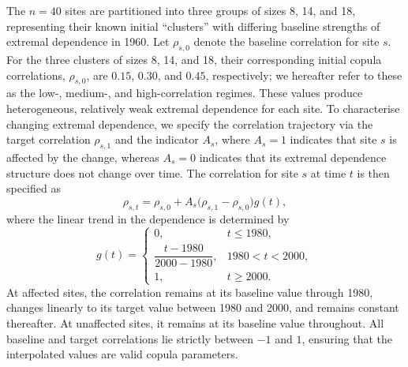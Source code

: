 \documentclass[APA,STIX1COL]{WileyNJD-v2}
\begin{document}
The $n=40$ sites are partitioned into three groups of sizes 8, 14, and 18, representing their known initial ``clusters'' with differing baseline strengths of extremal dependence in 1960.
Let $\rho_{s,0}$ denote the baseline correlation for site $s$. For the three clusters of sizes 8, 14, and 18, their corresponding initial copula correlations, $\rho_{s,0}$, are $0.15$, $0.30$, and $0.45$, respectively; we hereafter refer to these as the low-, medium-, and high-correlation regimes.
These values produce heterogeneous, relatively weak extremal dependence for each site.
To characterise changing extremal dependence, we specify the correlation trajectory via the target correlation $\rho_{s,1}$ and the indicator $A_s$, where $A_s=1$ indicates that site $s$ is affected by the change, whereas $A_s=0$ indicates that its extremal dependence structure does not change over time.
The correlation for site $s$ at time $t$ is then specified as 
\begin{equation}
\label{eq:sim_rho}
\rho_{s,t}=\rho_{s,0}+A_s\bigl(\rho_{s,1}-\rho_{s,0}\bigr)g(t),
\end{equation}
where the linear trend in the dependence is determined by 
\begin{equation}
\label{eq:sim_transition}
g(t)=
\begin{cases}
0, & t\leq 1980,\\
\dfrac{t-1980}{2000-1980}, & 1980<t<2000,\\
1, & t\geq 2000.
\end{cases}
\end{equation}
At affected sites, the correlation remains at its baseline value through 1980, changes linearly to its target value between 1980 and 2000, and remains constant thereafter. At unaffected sites, it remains at its baseline value throughout. All baseline and target correlations lie strictly between $-1$ and $1$, ensuring that the interpolated values are valid copula parameters.
\end{document}
